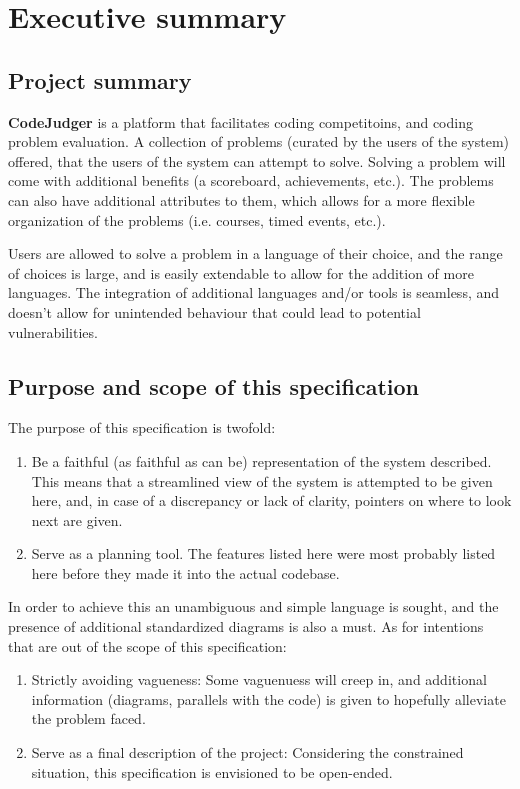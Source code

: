 \section{Executive summary}

\subsection{Project summary}
\textbf{CodeJudger} is a platform that facilitates coding competitoins, and coding problem evaluation. 
A collection of problems (curated by the users of the system) offered, that the users of the system
can attempt to solve. Solving a problem will come with additional benefits (a scoreboard, achievements, etc.).
The problems can also have additional attributes to them, which allows for a more flexible organization of the problems
(i.e. courses, timed events, etc.).

Users are allowed to solve a problem in a language of their choice, and the range of choices is large, and is
easily extendable to allow for the addition of more languages. The integration of additional languages and/or tools
is seamless, and doesn't allow for unintended behaviour that could lead to potential vulnerabilities.
\subsection{Purpose and scope of this specification}
The purpose of this specification is twofold:
\begin{enumerate}
    \item Be a faithful (as faithful as can be) representation of the system described. This means that a streamlined view of the system is attempted to be given here, and, in case of a discrepancy or lack of clarity, pointers on where to look next are given.
    \item Serve as a planning tool. The features listed here were most probably listed here before they made it into the actual codebase.
\end{enumerate}

In order to achieve this an unambiguous and simple language is sought, and the presence of additional standardized diagrams is also a must.
As for intentions that are out of the scope of this specification:
\begin{enumerate}
    \item Strictly avoiding vagueness: Some vaguenuess will creep in, and additional information (diagrams, parallels with the code) is given to hopefully alleviate the problem faced.
    \item Serve as a final description of the project: Considering the constrained situation, this specification is envisioned to be open-ended.
\end{enumerate}